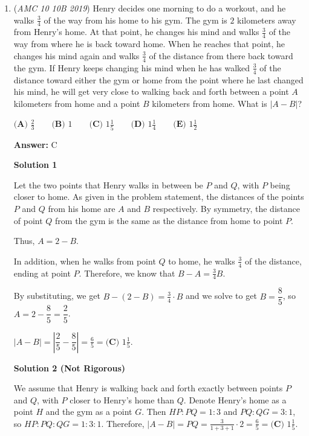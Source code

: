 \begin{enumerate}
	\item (\textit{AMC 10 10B 2019}) Henry decides one morning to do a workout, and he walks $\frac{3}{4}$ of the way from his home to his gym. The gym is $2$ kilometers away from Henry's home. At that point, he changes his mind and walks $\frac{3}{4}$ of the way from where he is back toward home. When he reaches that point, he changes his mind again and walks $\frac{3}{4}$ of the distance from there back toward the gym. If Henry keeps changing his mind when he has walked $\frac{3}{4}$ of the distance toward either the gym or home from the point where he last changed his mind, he will get very close to walking back and forth between a point $A$ kilometers from home and a point $B$ kilometers from home. What is $|A-B|$?


 $\textbf{(A) } \frac{2}{3} \qquad \textbf{(B) } 1 \qquad \textbf{(C) } 1\frac{1}{5} \qquad \textbf{(D) } 1\frac{1}{4} \qquad \textbf{(E) } 1\frac{1}{2}$

 \textbf{Answer: }C



\textbf{Solution 1}

Let the two points that Henry walks in between be $P$ and $Q$, with $P$ being closer to home. As given in the problem statement, the distances of the points $P$ and $Q$ from his home are $A$ and $B$ respectively. By symmetry, the distance of point $Q$ from the gym is the same as the distance from home to point $P$. 

 Thus, $A = 2 - B$. 

 In addition, when he walks from point $Q$ to home, he walks $\frac{3}{4}$ of the distance, ending at point $P$. Therefore, we know that $B - A = \frac{3}{4}B$. 

 By substituting, we get $B - (2-B) = \frac{3}{4}\cdot B$ and we solve to get $B=\dfrac{8}{5}$, so $A=2-\dfrac{8}{5}=\dfrac{2}{5}$. 

 $|A-B|=\left|\dfrac{2}{5}-\dfrac{8}{5} \right|=\frac{6}{5}=\boxed{\textbf{(C) } 1 \frac{1}{5}}$.

 



\textbf{Solution 2 (Not Rigorous)}

We assume that Henry is walking back and forth exactly between points $P$ and $Q$, with $P$ closer to Henry's home than $Q$. Denote Henry's home as a point $H$ and the gym as a point $G$. Then $HP:PQ = 1:3$ and $PQ:QG = 3:1$, so $HP:PQ:QG = 1:3:1$. Therefore, $|A-B| = PQ = \frac{3}{1+3+1} \cdot 2 = \frac{6}{5} = \boxed{\textbf{(C) } 1 \frac{1}{5}}$.


\end{enumerate}
